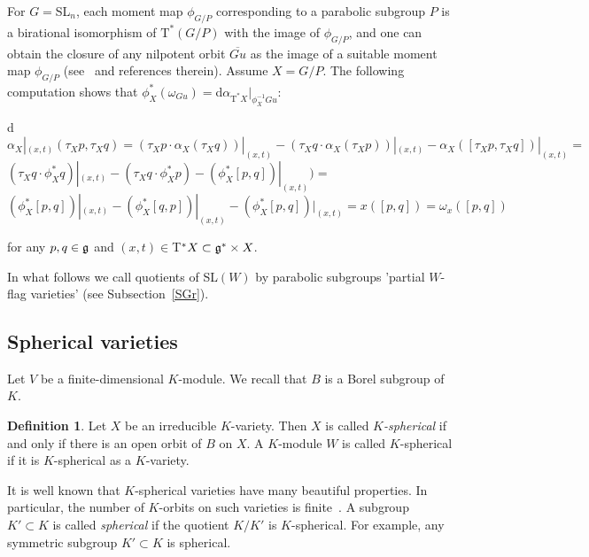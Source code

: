 \documentclass[12pt]{amsart}
\theoremstyle{definition}\newtheorem{theorem}{Theorem}[section]
\theoremstyle{definition}\newtheorem{definition}[proposition]{Definition}
\theoremstyle{remark}\newtheorem{example}[proposition]{Example}
\begin{document}
For $G=$SL$_n$, each moment map $\phi_{G/P}$ corresponding to a parabolic subgroup $P$ is a birational isomorphism of $\mathrm T^*(G/P)$ with the image of $\phi_{G/P}$, and one can obtain the closure of any nilpotent orbit $\overline{Gu}$ as the image of a suitable moment map $\phi_{G/P}$ (see~\cite{CM} and references therein). Assume $X=G/P$. The following computation shows that $\phi_X^*(\omega_{Gu})=$d$\alpha_{\mathrm T^*X}|_{\phi^{-1}_XGu}$:\begin{center}d$\alpha_X|_{(x, t)}(\tau_Xp, \tau_Xq)=(\tau_Xp\cdot\alpha_X(\tau_Xq))|_{(x, t)}-(\tau_Xq\cdot\alpha_X(\tau_Xp))|_{(x, t)}-\alpha_X([\tau_Xp, \tau_Xq])|_{(x, t)}=$\\$(\tau_Xq\cdot\phi^*_Xq)|_{(x, t)}-(\tau_Xq\cdot\phi^*_Xp)-(\phi^*_X[p,q])|_{(x, t)})=$\\$(\phi^*_X[p,q])|_{(x, t)}-(\phi^*_X[q, p])|_{(x, t)}-(\phi^*_X[p,q])|_{(x, t)}=x([p,q])=\omega_x([p,q])$\end{center} for any $p, q\in\frak g$ and $(x, t)\in$T$^*X\subset \frak g^*\times X$.

In what follows we call quotients of SL$(W)$ by parabolic subgroups 'partial $W$-flag varieties' (see Subsection~\ref{SGr}).
\subsection{Spherical varieties}\label{SSph} Let $V$ be a finite-dimensional $K$-module. We recall that $B$ is a Borel subgroup of $K$.
\begin{definition} Let $X$ be an irreducible $K$-variety. Then $X$ is called {\it $K$-spherical} if and only if there is an open
orbit of $B$ on $X$. A $K$-module $W$ is called $K$-spherical if it is $K$-spherical as a $K$-variety.\end{definition}
It is well known that $K$-spherical varieties have many beautiful properties. In particular, the number of $K$-orbits on such varieties is finite~\cite{VK}. A subgroup $K'\subset K$ is called {\it spherical} if the quotient $K/K'$ is $K$-spherical. For example, any symmetric subgroup $K'\subset K$ is spherical.
\end{document}
